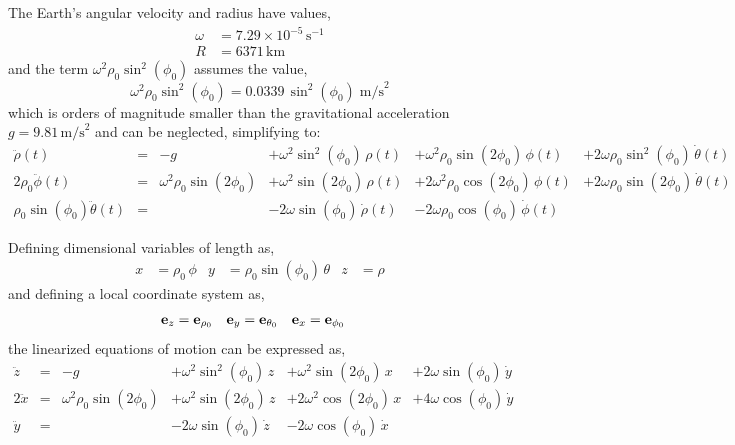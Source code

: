 \documentclass[12pt]{article}
\begin{document}
The Earth's angular velocity and radius have values,
\begin{align}
  \omega &= 7.29\times10^{-5}\,\text{s}^{-1} \\
  R      &= 6371\,\text{km}
\end{align}
and the term $\omega^2\rho_0\sin^2(\phi_0)$ assumes the value,
\begin{equation}
  \omega^2\rho_0\sin^2(\phi_0) = 0.0339\,\sin^2(\phi_0)\;\text{m/s}^2
\end{equation}
which is orders of magnitude smaller than the gravitational acceleration $g = 9.81\,\text{m/s}^2$
and can be neglected, simplifying to:
\begin{equation}
  \begin{alignedat}{6}
    \ddot\rho(t) &=& -g
      &+\omega^2\sin^2(\phi_0)\,\rho(t)
      &+\omega^2\rho_0\sin(2\phi_0)\,\phi(t)
      &+2\omega\rho_0\sin^2(\phi_0)\,\dot\theta(t) \\
    2\rho_0\ddot\phi(t) &=& \omega^2\rho_0\sin(2\phi_0)
      &+\omega^2\sin(2\phi_0)\,\rho(t)
      &+2\omega^2\rho_0\cos(2\phi_0)\,\phi(t)
      &+2\omega\rho_0\sin(2\phi_0)\,\dot\theta(t) \\
    \rho_0\sin(\phi_0)\ddot\theta(t) &=&
      &-2\omega\sin(\phi_0)\,\dot\rho(t)
      &-2\omega\rho_0\cos(\phi_0)\,\dot\phi(t)
  \end{alignedat}
\end{equation}

Defining dimensional variables of length as,
\begin{align}
  x &= \rho_0\,\phi & y &= \rho_0\sin(\phi_0)\,\theta & z &= \rho
\end{align}
and defining a local coordinate system as,
\begin{align}
  \vb{e}_z &= \vb{e}_{\rho_0} &
  \vb{e}_y &= \vb{e}_{\theta_0} &
  \vb{e}_x &= \vb{e}_{\phi_0}
\end{align}
the linearized equations of motion can be expressed as,
\begin{equation}
  \begin{alignedat}{6}
    \ddot{z} &=& -g
      &+\omega^2\sin^2(\phi_0)\,z
      &+\omega^2\sin(2\phi_0)\,x
      &+2\omega\sin(\phi_0)\,\dot{y} \\
    2\ddot{x} &=& \omega^2\rho_0\sin(2\phi_0)
      &+\omega^2\sin(2\phi_0)\,z
      &+2\omega^2\cos(2\phi_0)\,x
      &+4\omega\cos(\phi_0)\,\dot{y} \\
    \ddot{y} &=&
      &-2\omega\sin(\phi_0)\,\dot{z}
      &-2\omega\cos(\phi_0)\,\dot{x}
  \end{alignedat}
  \label{earth:local-cartesian-equations}
\end{equation}
\end{document}
